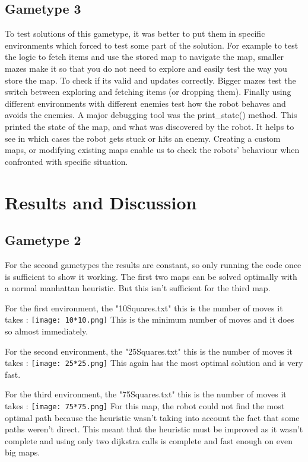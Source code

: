 \documentclass{cs255}
\begin{document}
\subsection{Gametype 3}

To test solutions of this gametype, it was better to put them in specific environments which forced to test some part of the solution.
For example to test the logic to fetch items and use the stored map to navigate the map, smaller mazes make it so that you do not need to explore and easily test the way you store the map.
To check if its valid and updates correctly.
Bigger mazes test the switch between exploring and fetching items (or dropping them).
Finally using different environments with different enemies test how the robot behaves and avoids the enemies.
A major debugging tool was the print\_state() method. This printed the state of the map, and what was discovered by the robot.
It helps to see in which cases the robot gets stuck or hits an enemy.
Creating a custom maps, or modifying existing maps enable us to check the robots' behaviour when confronted with specific situation.

\section{Results and Discussion}

\subsection{Gametype 2}
For the second gametypes the results are constant, so only running the code once is sufficient to show it working.
The first two maps can be solved optimally with a normal manhattan heuristic.
But this isn't sufficient for the third map.

For the first environment, the "10Squares.txt" this is the number of moves it takes :\newline
\texttt{[image: 10*10.png]}\newline
This is the minimum number of moves and it does so almost immediately.

For the second environment, the "25Squares.txt" this is the number of moves it takes :\newline
\texttt{[image: 25*25.png]}\newline
This again has the most optimal solution and is very fast.

For the third environment, the "75Squares.txt" this is the number of moves it takes :\newline
\texttt{[image: 75*75.png]}\newline
For this map, the robot could not find the most optimal path because the heuristic wasn't taking into account the fact that some paths weren't direct.
This meant that the heuristic must be improved as it wasn't complete and using only two dijkstra calls is complete and fast enough on even big maps.
\end{document}
